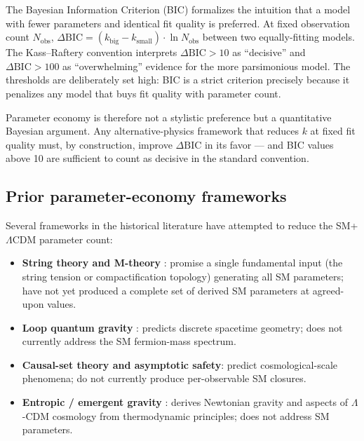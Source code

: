 The Bayesian Information Criterion (BIC) formalizes the
intuition that a model with fewer parameters and identical fit
quality is preferred. At fixed observation count $N_{\text{obs}}$,
$\Delta\mathrm{BIC} = (k_{\text{big}} - k_{\text{small}})\cdot\ln N_{\text{obs}}$
between two equally-fitting models. The Kass--Raftery convention
\cite{KassRaftery1995} interprets $\Delta\mathrm{BIC} > 10$ as
``decisive'' and $\Delta\mathrm{BIC} > 100$ as ``overwhelming''
evidence for the more parsimonious model. The thresholds are
deliberately set high: BIC is a strict criterion precisely because
it penalizes any model that buys fit quality with parameter count.

Parameter economy is therefore not a stylistic preference but a
quantitative Bayesian argument. Any alternative-physics framework
that reduces $k$ at fixed fit quality must, by construction,
improve $\Delta\mathrm{BIC}$ in its favor --- and BIC values above
10 are sufficient to count as decisive in the standard convention.

\subsection{Prior parameter-economy frameworks}
\label{sec:prior_frameworks}

Several frameworks in the historical literature have attempted to
reduce the SM+$\Lambda$CDM parameter count:

\begin{itemize}
  \item \textbf{String theory and M-theory} \cite{Polchinski1998,GSW1987}:
        promise a single fundamental input (the string tension or
        compactification topology) generating all SM
        parameters; have not yet produced a complete set of
        derived SM parameters at agreed-upon values.
  \item \textbf{Loop quantum gravity} \cite{Rovelli2004}: predicts
        discrete spacetime geometry; does not currently address
        the SM fermion-mass spectrum.
  \item \textbf{Causal-set theory and asymptotic safety}: predict
        cosmological-scale phenomena; do not currently produce
        per-observable SM closures.
  \item \textbf{Entropic / emergent gravity} \cite{Verlinde2011}:
        derives Newtonian gravity and aspects of
        $\Lambda$-CDM cosmology from thermodynamic principles;
        does not address SM parameters.
\end{itemize}

